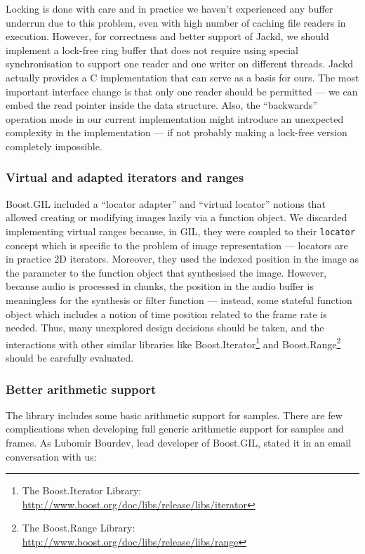 Locking is done with care and in practice we haven't experienced any
buffer underrun due to this problem, even with
high number of caching file readers in execution.  However, for
correctness and better support of Jackd, we should implement a
lock-free ring buffer \cite{valois94lock, michael95correction} that
does not require using special synchronisation to support one reader
and one writer on different threads. Jackd actually provides a C
implementation that can serve as a basis for ours. The most important
interface change is that only one reader should be permitted --- we
can embed the read pointer inside the data structure. Also, the
``backwards'' operation mode in our current implementation might
introduce an unexpected complexity in the implementation --- if not
probably making a lock-free version completely impossible.

\subsubsection{Virtual and adapted iterators and ranges}
\label{sec:fixsynth}

Boost.GIL included a ``locator adapter'' and ``virtual locator''
notions that allowed creating or modifying images lazily via a
function object. We discarded implementing virtual ranges because, in
GIL, they were coupled to their \texttt{locator} concept which is
specific to the problem of image representation --- locators are in
practice 2D iterators. Moreover, they used the indexed position in the
image as the parameter to the function object that synthesised the
image. However, because audio is processed in chunks, the position in
the audio buffer is meaningless for the synthesis or filter function
--- instead, some stateful function object which includes a notion of
time position related to the frame rate is needed. Thus, many
unexplored design decisions should be taken, and the interactions with
other similar libraries like Boost.Iterator\footnote{The
  Boost.Iterator Library:
  \url{http://www.boost.org/doc/libs/release/libs/iterator}} and
Boost.Range\footnote{The Boost.Range Library:
  \url{http://www.boost.org/doc/libs/release/libs/range}} should be
carefully evaluated.

\subsubsection{Better arithmetic support}

The library includes some basic arithmetic support for samples. There
are few complications when developing full generic arithmetic support
for samples and frames. As Lubomir Bourdev, lead developer of
Boost.GIL, stated it in an email conversation with us:

